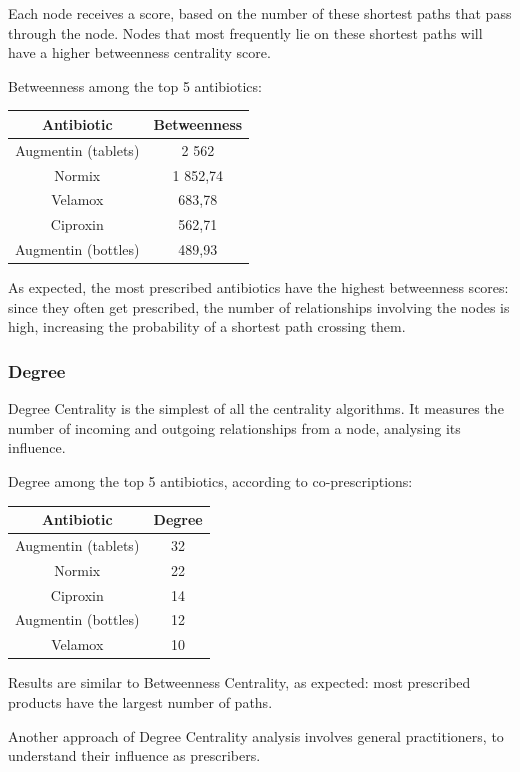 Each node receives a score, based on the number of these shortest paths that pass through the node. Nodes that most frequently lie on these shortest paths will have a higher betweenness centrality score. 

Betweenness among the top 5 antibiotics:
\begin{center}
	\begin{tabular}{c|c}
		Antibiotic & Betweenness \\
		\hline
		Augmentin (tablets) & 2 562 \\
		\hline
		Normix & 1 852,74 \\
		\hline
		Velamox & 683,78 \\
		\hline
		Ciproxin & 562,71 \\
		\hline
		Augmentin (bottles) & 489,93 \\
	\end{tabular}
\end{center}

As expected, the most prescribed antibiotics have the highest betweenness scores: since they often get prescribed, the number of relationships involving the nodes is high, increasing the probability of a shortest path crossing them.

\subsubsection{Degree}
Degree Centrality is the simplest of all the centrality algorithms. It measures the number of incoming and outgoing relationships from a node, analysing its influence.

Degree among the top 5 antibiotics, according to co-prescriptions:
\begin{center}
	\begin{tabular}{c|c}
		Antibiotic & Degree \\
		\hline
		Augmentin (tablets) & 32 \\
		\hline
		Normix & 22 \\
		\hline
		Ciproxin & 14 \\
		\hline
		Augmentin (bottles) & 12 \\
		\hline
		Velamox & 10 \\
	\end{tabular}
\end{center}

Results are similar to Betweenness Centrality, as expected: most prescribed products have the largest number of paths.

Another approach of Degree Centrality analysis involves general practitioners, to understand their influence as prescribers.

